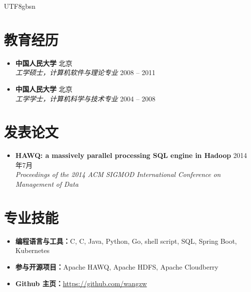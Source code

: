 \documentclass[10pt,a4paper]{article}
\newcommand{\entry}[4]{%
	\textbf{#1} \hfill {\color{subtle}#2}\\
	{\textit{#3}} \hfill {\color{subtle}\small #4}
}
\newcommand{\CPP}{C\nolinebreak[4]\hspace{-.05em}\raisebox{.22ex}{\footnotesize\bf ++}}
\begin{document}
\begin{CJK}{UTF8}{gbsn}
\section*{教育经历}

\begin{itemize}
	\item
	\entry{中国人民大学}{北京}
		{工学硕士，计算机软件与理论专业}{2008 -- 2011}

	\item
	\entry{中国人民大学}{北京}
		{工学学士，计算机科学与技术专业}{2004 -- 2008}
\end{itemize}

\section*{发表论文}

\begin{itemize}
	\item
	\textbf{HAWQ: a massively parallel processing SQL engine in Hadoop} \hfill {\color{subtle}2014年7月}\\
	\textit{Proceedings of the 2014 ACM SIGMOD International Conference on Management of Data}
\end{itemize}

\section*{专业技能}

\begin{itemize}[label={}, leftmargin=0pt, itemsep=2pt]
	\item \textbf{编程语言与工具：}C, \CPP, Java, Python, Go, shell script, SQL, Spring Boot, Kubernetes
	\item \textbf{参与开源项目：}Apache HAWQ, Apache HDFS, Apache Cloudberry
	\item \textbf{Github 主页：}\href{https://github.com/wangzw}{https://github.com/wangzw}
\end{itemize}

\end{CJK}
\end{document}
